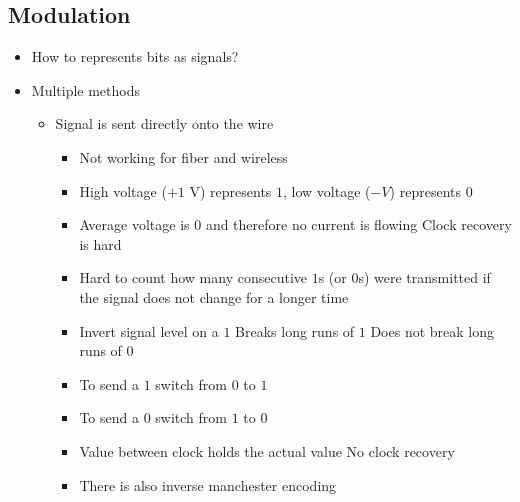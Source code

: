 \subsection{Modulation}
\begin{itemize}
    \item How to represents bits as signals?
    \item Multiple methods
        \begin{itemize}
            \item Signal is sent directly onto the wire
                \begin{itemize}
                    \item Not working for fiber and wireless
                \end{itemize}
                \begin{itemize}
                    \item High voltage ($+1$ V) represents $1$, low voltage ($-V$) represents $0$
                    \item Average voltage is $0$ and therefore no current is flowing
                    \icon Clock recovery is hard
                \end{itemize}
                \begin{itemize}
                    \item Hard to count how many consecutive $1$s (or $0$s) were transmitted if the signal does not change for a longer time
                \end{itemize}
                \begin{itemize}
                    \item Invert signal level on a $1$
                    \ipro Breaks long runs of $1$
                    \icon Does not break long runs of $0$
                \end{itemize}
                \begin{itemize}
                    \item To send a $1$ switch from $0$ to $1$
                    \item To send a $0$ switch from $1$ to $0$
                    \item Value between clock holds the actual value
                    \ipro No clock recovery
                    \item There is also inverse manchester encoding

\end{itemize}
\end{itemize}
\end{itemize}
